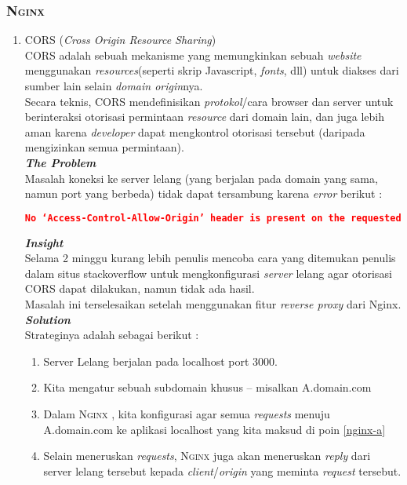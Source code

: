 \subsubsection{\textsc{Nginx}}

\begin{enumerate}
	\item CORS (\textit{Cross Origin Resource Sharing})
	\\
	\indentenum CORS adalah sebuah mekanisme yang memungkinkan  sebuah \textit{website} menggunakan \textit{resources}(seperti skrip Javascript, \textit{fonts}, dll) untuk diakses dari sumber lain selain \textit{domain origin}nya.\\ 
	\indentenum Secara teknis, CORS mendefinisikan \textit{protokol}/cara browser dan server untuk berinteraksi otorisasi permintaan \textit{resource} dari domain lain, dan juga lebih aman karena \textit{developer} dapat mengkontrol otorisasi tersebut (daripada mengizinkan semua permintaan).\\
	
	\textbf{\textit{The Problem}} \\
	\indentenum  Masalah koneksi ke server lelang (yang berjalan pada domain yang sama, namun port yang berbeda) tidak dapat tersambung karena \textit{error} berikut :
	\begin{lstlisting}[language=json]
No ‘Access-Control-Allow-Origin’ header is present on the requested resource.
	\end{lstlisting}
	
	
	\textbf{\textit{Insight}} \\
	\indentenum Selama 2 minggu kurang lebih penulis mencoba cara yang ditemukan penulis dalam situs stackoverflow untuk mengkonfigurasi \textit{server} lelang agar otorisasi CORS dapat dilakukan, namun tidak ada hasil.\\
	\indent Masalah ini terselesaikan setelah menggunakan fitur \textit{reverse proxy} dari Nginx.\\
	
	\textbf{\textit{Solution}} \\
	\indentenum Strateginya adalah sebagai berikut :
	\begin{enumerate}
		\item \label{nginx-a} Server Lelang berjalan pada localhost port 3000.
		\item \label{nginx-b} Kita mengatur sebuah subdomain khusus -- misalkan A.domain.com
		\item Dalam \textsc{Nginx} , kita konfigurasi agar semua \textit{requests} menuju A.domain.com ke aplikasi localhost yang kita maksud di poin \ref{nginx-a}
		\item Selain meneruskan \textit{requests}, \textsc{Nginx} juga akan meneruskan \textit{reply} dari server lelang tersebut kepada \textit{client}/\textit{origin} yang meminta \textit{request} tersebut.				
	\end{enumerate}
\end{enumerate}